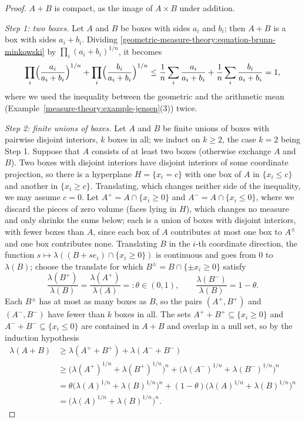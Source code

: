 \begin{proof}
$A + B$ is compact, as the image of $A \times B$ under addition.

\emph{Step 1: two boxes.} Let $A$ and $B$ be boxes with sides $a_i$ and $b_i$; then $A + B$ is a box with sides $a_i + b_i$. Dividing \eqref{geometric-measure-theory:equation-brunn-minkowski} by
$\prod_i(a_i + b_i)^{1/n}$, it becomes
\[
\prod_i\Bigl(\frac{a_i}{a_i + b_i}\Bigr)^{1/n} + \prod_i\Bigl(\frac{b_i}{a_i + b_i}\Bigr)^{1/n} \leq \frac1n\sum_i\frac{a_i}{a_i + b_i} + \frac1n\sum_i\frac{b_i}{a_i + b_i} = 1,
\]
where we used the inequality between the geometric and the arithmetic mean (Example~\ref{measure-theory:example-jensen}(3)) twice.

\emph{Step 2: finite unions of boxes.} Let $A$ and $B$ be finite unions of boxes with pairwise disjoint interiors, $k$ boxes in all; we induct on $k \geq 2$, the case $k = 2$ being Step 1. Suppose that
$A$ consists of at least two boxes (otherwise exchange $A$ and $B$). Two boxes with disjoint interiors have disjoint interiors of some coordinate projection, so there is a hyperplane
$H = \{x_i = c\}$ with one box of $A$ in $\{x_i \leq c\}$ and another in $\{x_i \geq c\}$. Translating, which changes neither side of the inequality, we may assume $c = 0$. Let
$A^+ = A \cap \{x_i \geq 0\}$ and $A^- = A \cap \{x_i \leq 0\}$, where we discard the pieces of zero volume (faces lying in $H$), which changes no measure and only shrinks the sums below; each is a union
of boxes with disjoint interiors, with fewer boxes than $A$, since each box of $A$ contributes at most one box to $A^\pm$ and one box contributes none. Translating $B$ in the $i$-th coordinate direction, the function $s \mapsto \lambda((B + se_i) \cap \{x_i \geq 0\})$ is continuous and goes from $0$ to $\lambda(B)$; choose the
translate for which $B^\pm = B \cap \{\pm x_i \geq 0\}$ satisfy
\[
\frac{\lambda(B^+)}{\lambda(B)} = \frac{\lambda(A^+)}{\lambda(A)} =: \theta \in (0, 1), \qquad \frac{\lambda(B^-)}{\lambda(B)} = 1 - \theta.
\]
Each $B^\pm$ has at most as many boxes as $B$, so the pairs $(A^+, B^+)$ and $(A^-, B^-)$ have fewer than $k$ boxes in all. The sets $A^+ + B^+ \subseteq \{x_i \geq 0\}$ and $A^- + B^- \subseteq \{x_i \leq 0\}$
are contained in $A + B$ and overlap in a null set, so by the induction hypothesis
\[\begin{aligned}
\lambda(A + B) &\geq \lambda(A^+ + B^+) + \lambda(A^- + B^-) \\
&\geq \bigl(\lambda(A^+)^{1/n} + \lambda(B^+)^{1/n}\bigr)^n + \bigl(\lambda(A^-)^{1/n} + \lambda(B^-)^{1/n}\bigr)^n \\
&= \theta\bigl(\lambda(A)^{1/n} + \lambda(B)^{1/n}\bigr)^n + (1 - \theta)\bigl(\lambda(A)^{1/n} + \lambda(B)^{1/n}\bigr)^n \\
&= \bigl(\lambda(A)^{1/n} + \lambda(B)^{1/n}\bigr)^n.
\end{aligned}\]


\end{proof}
